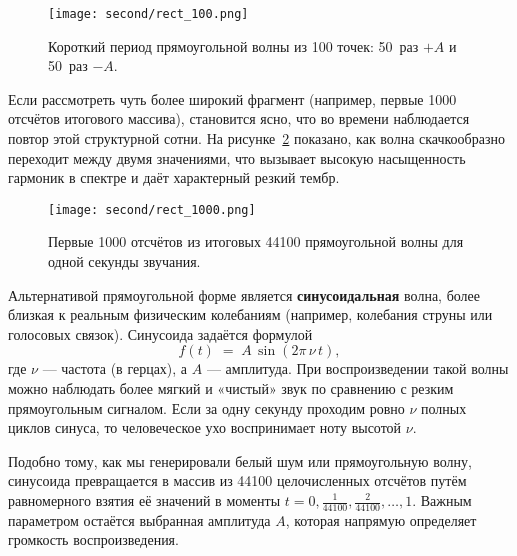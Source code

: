 \documentclass[bachelor, och, diploma]{SCWorks}
\begin{document}
\begin{figure}[h!]
\centering
\texttt{[image: second/rect\_100.png]}
\caption{Короткий период прямоугольной волны из 100 точек: 50~раз $+A$ и 50~раз $-A$.}
\label{fig:rect_part}
\end{figure}

Если рассмотреть чуть более широкий фрагмент (например, первые 1000 отсчётов итогового массива), становится ясно, что во времени наблюдается повтор этой структурной сотни. На рисунке~\ref{fig:rect_1000} показано, как волна скачкообразно переходит между двумя значениями, что вызывает высокую насыщенность гармоник в спектре и даёт характерный резкий тембр.

\begin{figure}[h!]
\centering
\texttt{[image: second/rect\_1000.png]}
\caption{Первые 1000 отсчётов из итоговых 44100 прямоугольной волны для одной секунды звучания.}
\label{fig:rect_1000}
\end{figure}

Альтернативой прямоугольной форме является \textbf{синусоидальная} волна, более близкая к реальным физическим колебаниям (например, колебания струны или голосовых связок). Синусоида задаётся формулой
\[
f(t) \;=\; A \,\sin(2\pi \,\nu \, t),
\]
где $\nu$ --- частота (в герцах), а $A$ --- амплитуда. При воспроизведении такой волны можно наблюдать более мягкий и «чистый» звук по сравнению с резким прямоугольным сигналом. Если за одну секунду проходим ровно $\nu$ полных циклов синуса, то человеческое ухо воспринимает ноту высотой $\nu$. 



Подобно тому, как мы генерировали белый шум или прямоугольную волну, синусоида превращается в массив из 44100 целочисленных отсчётов путём равномерного взятия её значений в моменты $t = 0, \frac{1}{44100}, \frac{2}{44100}, \dots, 1$. Важным параметром остаётся выбранная амплитуда $A$, которая напрямую определяет громкость воспроизведения.
\end{document}

